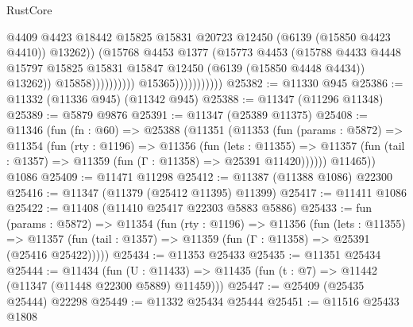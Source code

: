 \begin{lexlean}{RustCore}
\begin{coremodule}
                                                @4409
                                                @4423
                                                @18442
                                                @15825
                                                @15831
                                                @20723
                                                @12450
                                                (@6139 (@15850 @4423 @4410))
                                                @13262))
                                            (@15768
                                              @4453
                                              @1377
                                              (@15773
                                                @4453
                                                (@15788
                                                  @4433
                                                  @4448
                                                  @15797
                                                  @15825
                                                  @15831
                                                  @15847
                                                  @12450
                                                  (@6139 (@15850 @4448 @4434))
                                                  @13262))
                                              @15858))))))))))
                          @15365)))))))))))
@25382 := @11330 @945
@25386 := @11332 (@11336 @945) (@11342 @945)
@25388 := @11347 (@11296 @11348)
@25389 := @5879 @9876
@25391 := @11347 (@25389 @11375)
@25408 := @11346
    (fun (fn : @60) =>
    @25388
      (@11351
        (@11353
          (fun (params : @5872) =>
          @11354
            (fun (rty : @1196) =>
            @11356
              (fun (lets : @11355) =>
              @11357 (fun (tail : @1357) => @11359 (fun (Γ : @11358) => @25391 @11420))))))
        @11465))
    @1086
@25409 := @11471 @11298
@25412 := @11387 (@11388 @1086) @22300
@25416 := @11347 (@11379 (@25412 @11395) @11399)
@25417 := @11411 @1086
@25422 := @11408 (@11410 @25417 @22303 @5883 @5886)
@25433 := fun (params : @5872) =>
  @11354
    (fun (rty : @1196) =>
    @11356
      (fun (lets : @11355) =>
      @11357 (fun (tail : @1357) => @11359 (fun (Γ : @11358) => @25391 (@25416 @25422)))))
@25434 := @11353 @25433
@25435 := @11351 @25434
@25444 := @11434
    (fun (U : @11433) => @11435 (fun (t : @7) => @11442 (@11347 (@11448 @22300 @5889) @11459)))
@25447 := @25409 (@25435 @25444) @22298
@25449 := @11332 @25434 @25444
@25451 := @11516 @25433 @1808

\end{coremodule}
\end{lexlean}
